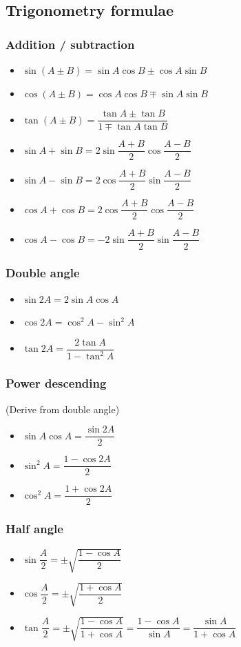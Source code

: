 \documentclass[A4paper]{article}
\begin{document}
	\subsection{Trigonometry formulae}
	\subsubsection{Addition / subtraction}
	\begin{itemize}
		\item $\sin (A \pm B) = \sin A \cos B \pm \cos A \sin B$
		\item $\cos (A \pm B) = \cos A \cos B \mp \sin A \sin B$
		\item $\tan (A \pm B) = \dfrac{\tan A \pm \tan B}{1 \mp \tan A \tan B}$
		\item $\sin A + \sin B = 2\sin \dfrac{A+B}{2} \cos\dfrac{A-B}{2}$
		\item $\sin A - \sin B = 2\cos \dfrac{A+B}{2} \sin\dfrac{A-B}{2}$
		\item $\cos A + \cos B = 2\cos \dfrac{A+B}{2} \cos\dfrac{A-B}{2}$
		\item $\cos A - \cos B = -2\sin \dfrac{A+B}{2} \sin\dfrac{A-B}{2}$
	\end{itemize}
	\subsubsection{Double angle}
	\begin{itemize}
		\item $\sin 2A = 2\sin A \cos A$
		\item $\cos 2A = \cos^2 A - \sin^2 A$
		\item $\tan 2A = \dfrac{2\tan A}{1-\tan^2 A}$
	\end{itemize}
	\subsubsection{Power descending}
	(Derive from double angle)
	\begin{itemize}
		\item $\sin A \cos A = \dfrac{\sin2A}{2}$
		\item $\sin^2 A = \dfrac{1-\cos2A}{2}$
		\item $\cos^2 A = \dfrac{1+\cos2A}{2}$
	\end{itemize}
	\subsubsection{Half angle}
	\begin{itemize}
		\item $\sin \dfrac{A}{2} = \pm \sqrt{\dfrac{1-\cos A}{2}}$
		\item $\cos \dfrac{A}{2} = \pm \sqrt{\dfrac{1+\cos A}{2}}$
		\item $\tan \dfrac{A}{2} = \pm \sqrt{\dfrac{1-\cos A}{1+\cos A}} = \dfrac{1-\cos A}{\sin A} = \dfrac{\sin A}{1+\cos A}$
	\end{itemize}
\end{document}
